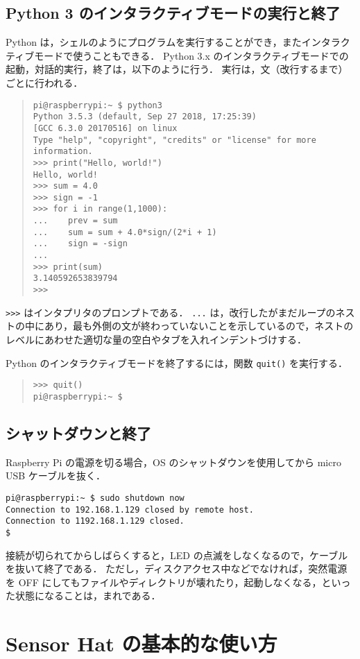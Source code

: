 \documentclass[11pt,a4,epsf]{report}
\begin{document}
\subsection{Python 3 のインタラクティブモードの実行と終了}

Python は，シェルのようにプログラムを実行することができ，またインタラクティブモードで使うこともできる．
Python 3.x のインタラクティブモードでの起動，対話的実行，終了は，以下のように行う．
実行は，文（改行するまで）ごとに行われる．
\begin{quote}
\small
\begin{verbatim}
pi@raspberrypi:~ $ python3
Python 3.5.3 (default, Sep 27 2018, 17:25:39) 
[GCC 6.3.0 20170516] on linux
Type "help", "copyright", "credits" or "license" for more information.
>>> print("Hello, world!")
Hello, world!
>>> sum = 4.0
>>> sign = -1
>>> for i in range(1,1000):
...    prev = sum
...    sum = sum + 4.0*sign/(2*i + 1)
...    sign = -sign
... 
>>> print(sum)
3.140592653839794
>>> 
\end{verbatim}
\end{quote}
\verb+>>>+ はインタプリタのプロンプトである．
\verb+...+ は，改行したがまだループのネストの中にあり，最も外側の文が終わっていないことを示しているので，ネストのレベルにあわせた適切な量の空白やタブを入れインデントづけする．

Python のインタラクティブモードを終了するには，関数 \verb+quit()+ を実行する．
\begin{quote}
\begin{verbatim}
>>> quit()
pi@raspberrypi:~ $ 
\end{verbatim}
\end{quote}

\subsection{シャットダウンと終了}

Raspberry Pi の電源を切る場合，OS のシャットダウンを使用してから micro USB ケーブルを抜く．
\begin{verbatim}
pi@raspberrypi:~ $ sudo shutdown now
Connection to 192.168.1.129 closed by remote host.
Connection to 1192.168.1.129 closed.
$ 
\end{verbatim}
接続が切られてからしばらくすると，LED の点滅をしなくなるので，ケーブルを抜いて終了である．
ただし，ディスクアクセス中などでなければ，突然電源を OFF にしてもファイルやディレクトリが壊れたり，起動しなくなる，といった状態になることは，まれである．

\section{Sensor Hat の基本的な使い方}
\end{document}
